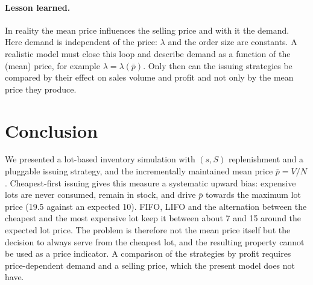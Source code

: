 \documentclass[11pt,a4paper]{article}
\begin{document}
\paragraph{Lesson learned.}
In reality the mean price influences the selling price and with it the demand.
Here demand is independent of the price: $\lambda$ and the order size are
constants. A realistic model must close this loop and describe demand as a
function of the (mean) price, for example $\lambda=\lambda(\bar p)$. Only then
can the issuing strategies be compared by their effect on sales volume and
profit and not only by the mean price they produce.

\section{Conclusion}

We presented a lot-based inventory simulation with $(s,S)$ replenishment and a
pluggable issuing strategy, and the incrementally maintained mean price
$\bar p=V/N$. Cheapest-first issuing gives this measure a systematic upward
bias: expensive lots are never consumed, remain in stock, and drive $\bar p$
towards the maximum lot price (19.5 against an expected 10). FIFO, LIFO and the
alternation between the cheapest and the most expensive lot keep it between
about 7 and 15 around the expected lot price. The problem is therefore not the
mean price itself but the decision to always serve from the cheapest lot, and
the resulting property cannot be used as a price indicator. A comparison of
the strategies by profit requires price-dependent demand and a selling price,
which the present model does not have.
\end{document}
